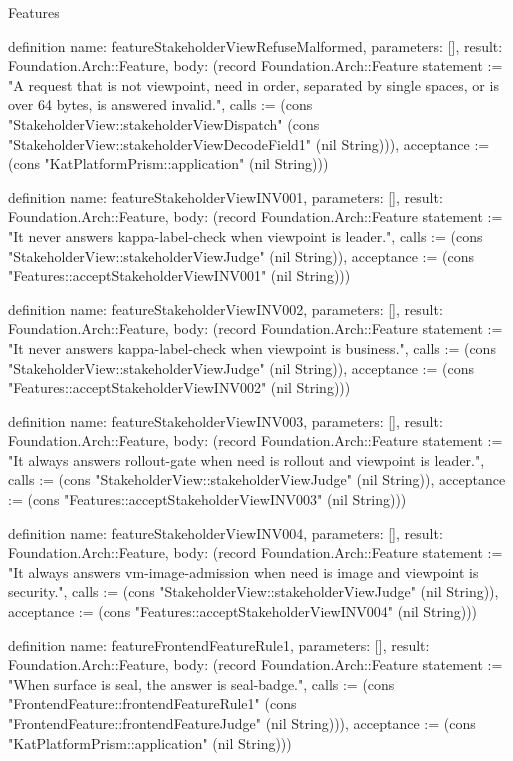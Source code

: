 \begin{lexlean}{Features}
\begin{semanticmodule}
definition{
  name: featureStakeholderViewRefuseMalformed,
  parameters: [],
  result: Foundation.Arch::Feature,
  body: (record Foundation.Arch::Feature {statement := "A request that is not viewpoint, need in order, separated by single spaces, or is over 64 bytes, is answered invalid.", calls := (cons "StakeholderView::stakeholderViewDispatch" (cons "StakeholderView::stakeholderViewDecodeField1" (nil String))), acceptance := (cons "KatPlatformPrism::application" (nil String))})
}

definition{
  name: featureStakeholderViewINV001,
  parameters: [],
  result: Foundation.Arch::Feature,
  body: (record Foundation.Arch::Feature {statement := "It never answers kappa-label-check when viewpoint is leader.", calls := (cons "StakeholderView::stakeholderViewJudge" (nil String)), acceptance := (cons "Features::acceptStakeholderViewINV001" (nil String))})
}

definition{
  name: featureStakeholderViewINV002,
  parameters: [],
  result: Foundation.Arch::Feature,
  body: (record Foundation.Arch::Feature {statement := "It never answers kappa-label-check when viewpoint is business.", calls := (cons "StakeholderView::stakeholderViewJudge" (nil String)), acceptance := (cons "Features::acceptStakeholderViewINV002" (nil String))})
}

definition{
  name: featureStakeholderViewINV003,
  parameters: [],
  result: Foundation.Arch::Feature,
  body: (record Foundation.Arch::Feature {statement := "It always answers rollout-gate when need is rollout and viewpoint is leader.", calls := (cons "StakeholderView::stakeholderViewJudge" (nil String)), acceptance := (cons "Features::acceptStakeholderViewINV003" (nil String))})
}

definition{
  name: featureStakeholderViewINV004,
  parameters: [],
  result: Foundation.Arch::Feature,
  body: (record Foundation.Arch::Feature {statement := "It always answers vm-image-admission when need is image and viewpoint is security.", calls := (cons "StakeholderView::stakeholderViewJudge" (nil String)), acceptance := (cons "Features::acceptStakeholderViewINV004" (nil String))})
}

definition{
  name: featureFrontendFeatureRule1,
  parameters: [],
  result: Foundation.Arch::Feature,
  body: (record Foundation.Arch::Feature {statement := "When surface is seal, the answer is seal-badge.", calls := (cons "FrontendFeature::frontendFeatureRule1" (cons "FrontendFeature::frontendFeatureJudge" (nil String))), acceptance := (cons "KatPlatformPrism::application" (nil String))})
}


\end{semanticmodule}
\end{lexlean}
